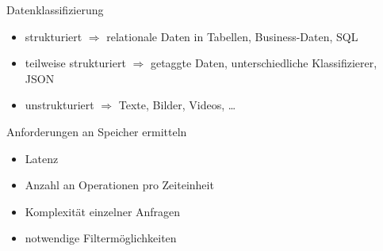 
\begin{flashcard}[Definition]{Datenklassifizierung}
    \begin{itemize}
        \item strukturiert\newline
        $\Rightarrow$ relationale Daten in Tabellen, Business-Daten, SQL
        \item teilweise strukturiert\newline
        $\Rightarrow$ getaggte Daten, unterschiedliche Klassifizierer, JSON
        \item unstrukturiert\newline
        $\Rightarrow$ Texte, Bilder, Videos, \ldots
    \end{itemize}
\end{flashcard}

\begin{flashcard}[Definition]{Anforderungen an Speicher ermitteln}
    \begin{itemize}
        \item Latenz
        \item Anzahl an Operationen pro Zeiteinheit
        \item Komplexität einzelner Anfragen
        \item notwendige Filtermöglichkeiten
    \end{itemize}
\end{flashcard}


